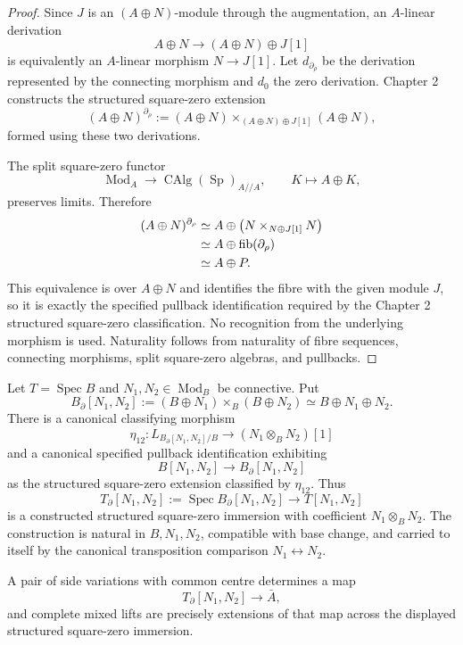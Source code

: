 \begin{proof}
Since \(J\) is an \((A\oplus N)\)-module through the augmentation, an \(A\)-linear derivation
\[
    A\oplus N
    \longrightarrow
    (A\oplus N)\oplus J[1]
\]
is equivalently an \(A\)-linear morphism \(N\to J[1]\).  Let \(d_{\partial_\rho}\) be the derivation represented by the connecting morphism and \(d_0\) the zero derivation.  Chapter 2 constructs the structured square-zero extension
\[
    (A\oplus N)^{\partial_\rho}
    :=
    (A\oplus N)
    \times_{(A\oplus N)\oplus J[1]}
    (A\oplus N),
\]
formed using these two derivations.

The split square-zero functor
\[
    \operatorname{Mod}_A
    \longrightarrow
    \operatorname{CAlg}(\operatorname{Sp})_{A//A},
    \qquad
    K\longmapsto A\oplus K,
\]
preserves limits.  Therefore
\[
\begin{aligned}
    (A\oplus N)^{\partial_\rho}
    &\simeq
    A\oplus
    \left(
      N\times_{N\oplus J[1]}N
    \right)\\
    &\simeq
    A\oplus\operatorname{fib}(\partial_\rho)\\
    &\simeq
    A\oplus P.
\end{aligned}
\]
This equivalence is over \(A\oplus N\) and identifies the fibre with the given module \(J\), so it is exactly the specified pullback identification required by the Chapter 2 structured square-zero classification.  No recognition from the underlying morphism is used.  Naturality follows from naturality of fibre sequences, connecting morphisms, split square-zero algebras, and pullbacks.
\end{proof}

\begin{lemma}
\label{lem:var-mixed-boundary-square-zero}
Let \(T=\operatorname{Spec}B\) and \(N_1,N_2\in\operatorname{Mod}_B\) be connective.  Put
\[
    B_{\partial}[N_1,N_2]
    :=
    (B\oplus N_1)\times_B(B\oplus N_2)
    \simeq
    B\oplus N_1\oplus N_2.
\]
There is a canonical classifying morphism
\[
    \boxed{
    \eta_{12}:
    L_{B_{\partial}[N_1,N_2]/B}
    \longrightarrow
    (N_1\otimes_BN_2)[1]
    }
\]
and a canonical specified pullback identification exhibiting
\[
    \boxed{
    B[N_1,N_2]
    \longrightarrow
    B_{\partial}[N_1,N_2]
    }
\]
as the structured square-zero extension classified by \(\eta_{12}\).  Thus
\[
    T_{\partial}[N_1,N_2]
    :=
    \operatorname{Spec}B_{\partial}[N_1,N_2]
    \longrightarrow
    T[N_1,N_2]
\]
is a constructed structured square-zero immersion with coefficient \(N_1\otimes_BN_2\).  The construction is natural in \(B,N_1,N_2\), compatible with base change, and carried to itself by the canonical transposition comparison \(N_1\leftrightarrow N_2\).

A pair of side variations with common centre determines a map
\[
    T_{\partial}[N_1,N_2]\longrightarrow\bar A,
\]
and complete mixed lifts are precisely extensions of that map across the displayed structured square-zero immersion.
\end{lemma}

